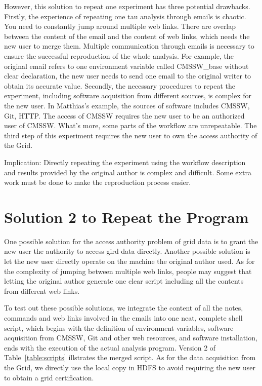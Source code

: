 \documentclass{acm_proc_article-sp}
\begin{document}
However, this solution to repeat one experiment has three potential drawbacks.
Firstly, the experience of repeating one tau analysis through emails is
chaotic. You need to constantly jump around multiple web links. There are overlap
between the content of the email and the content of web links, which needs the
new user to merge them. Multiple communication through emails is necessary to
ensure the successful reproduction of the whole analysis. For example, the original
email refers to one environment variable called CMSSW\_base without clear
declaration, the new user needs to send one email to the original writer to
obtain its accurate value. Secondly, the necessary procedures to repeat the
experiment, including software acquisition from different sources, is complex
for the new user. In Matthias's example, the sources of software includes
CMSSW, Git, HTTP. The access of CMSSW requires the new user to be an authorized
user of CMSSW. What's more, some parts of the workflow are unrepeatable. The
third step of this experiment requires the new user to own the access authority
of the Grid. 

Implication: Directly repeating the experiment using the workflow description and results provided by the original author is complex and difficult. Some extra work must be done to make the reproduction process easier.

\section{Solution 2 to Repeat the Program}
One possible solution for the access authority problem of grid data is to grant the new user the authority to access gird data directly. Another possible solution is let the new user directly operate on the machine the original author used. As for the complexity of jumping between multiple web links, people may suggest that letting the original author generate one clear script including all the contents from different web links.

To test out these possible solutions, we integrate the content of all the notes, commands and web links involved in the emails into one neat, complete shell script, which begins with the definition of environment variables, software acquisition from CMSSW, Git and other web resources, and software installation, ends with the execution of the actual analysis program. Version 2 of Table~\ref{table:scripts} illstrates the merged script. As for the data acquisition from the Grid, we directly use the local copy in HDFS to avoid requiring the new user to obtain a grid certification.
\end{document}
